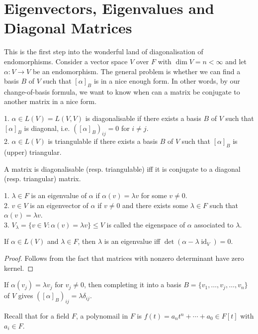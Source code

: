 \section{Eigenvectors, Eigenvalues and Diagonal Matrices}
This is the first step into the wonderful land of diagonalisation of endomorphisms.
Consider a vector space $V$ over $F$ with $\dim V=n<\infty$ and let $\alpha:V\to V$ be an endomorphism.
The general problem is whether we can find a basis $B$ of $V$ such that $[\alpha]_B$ is in a nice enough form.
In other words, by our change-of-basis formula, we want to know when can a matrix be conjugate to another matrix in a nice form.
\begin{definition}
    1. $\alpha\in L(V)=L(V,V)$ is diagonalisable if there exists a basis $B$ of $V$ such that $[\alpha]_B$ is diagonal, i.e. $([\alpha]_B)_{ij}=0$ for $i\neq j$.\\
    2. $\alpha\in L(V)$ is triangulable if there exists a basis $B$ of $V$ such that $[\alpha]_B$ is (upper) triangular.
\end{definition}
\begin{remark}
    A matrix is diagonalisable (resp. triangulable) iff it is conjugate to a diagonal (resp. triangular) matrix.
\end{remark}
\begin{definition}
    1. $\lambda\in F$ is an eigenvalue of $\alpha$ if $\alpha(v)=\lambda v$ for some $v\neq 0$.\\
    2. $v\in V$ is an eigenvector of $\alpha$ if $v\neq 0$ and there exists some $\lambda\in F$ such that $\alpha(v)=\lambda v$.\\
    3. $V_\lambda=\{v\in V:\alpha(v)=\lambda v\}\le V$ is called the eigenspace of $\alpha$ associated to $\lambda$.
\end{definition}
\begin{lemma}
    If $\alpha\in L(V)$ and $\lambda\in F$, then $\lambda$ is an eigenvalue iff $\det(\alpha-\lambda\operatorname{id}_V)=0$.
\end{lemma}
\begin{proof}
    Follows from the fact that matrices with nonzero determinant have zero kernel.
\end{proof}
\begin{remark}
    If $\alpha(v_j)=\lambda v_j$ for $v_j\neq 0$, then completing it into a basis $B=\{v_1,\ldots,v_j,\ldots,v_n\}$ of $V$ gives $([\alpha]_B)_{ij}=\lambda\delta_{ij}$.
\end{remark}
Recall that for a field $F$, a polynomail in $F$ is $f(t)=a_nt^n+\cdots+a_0\in F[t]$ with $a_i\in F$.

